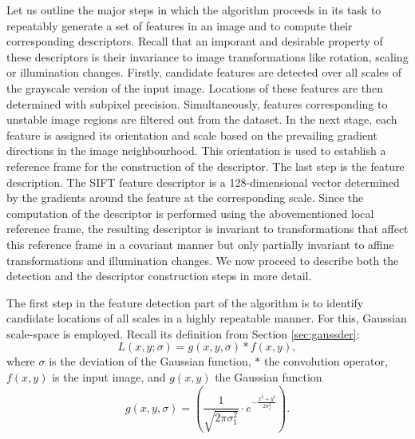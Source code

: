 Let us outline the major steps in which the algorithm proceeds in its task to repeatably generate a set of features in an image and to compute their corresponding descriptors. 
Recall that an imporant and desirable property of these descriptors is their invariance to image transformations like rotation, scaling or illumination changes. 
Firstly, candidate features are detected over all scales of the grayscale version of the input image. 
Locations of these features are then determined with subpixel precision. 
Simultaneously, features corresponding to unstable image regions are filtered out from the dataset. 
In the next stage, each feature is assigned its orientation and scale based on the prevailing gradient directions in the image neighbourhood. 
This orientation is used to establish a reference frame for the construction of the descriptor.
The last step is the feature description.
The SIFT feature descriptor is a 128-dimensional vector determined by the gradients around the feature at the corresponding scale. 
Since the computation of the descriptor is performed using the abovementioned local reference frame, 
the resulting descriptor is invariant to transformations that affect this reference frame in a covariant manner but only partially invariant to affine transformations and illumination changes.
We now proceed to describe both the detection and the descriptor construction steps in more detail.

The first step in the feature detection part of the algorithm is to identify candidate locations of all scales in a highly repeatable manner. 
For this, Gaussian scale-space is employed. 
Recall its definition from Section \ref{sec:gaussder}:
\[
L(x, y; \sigma) = g(x, y, \sigma) * f(x, y),
\]
where $\sigma$ is the deviation of the Gaussian function, $*$ the convolution operator, $f(x, y)$ is the input image, and $g(x, y)$ the Gaussian function
\[
 g(x, y, \sigma) = \left( \frac{1}{\sqrt{2\pi \sigma _1^{2}}} \cdot e^{-\frac{x^{2}+y^{2}}{2\sigma_1^{2}} } \right).
\]

